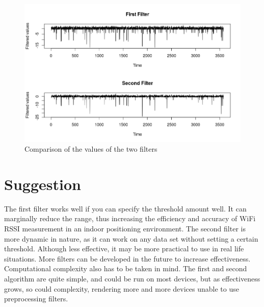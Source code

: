 \begin{figure}[h!]
	\centering
		\includegraphics[width=.9\linewidth]{figures/comp3.png}
		\caption{Comparison of the values of the two filters \cite{thirdcomp}}\label{fig:thirdComp}
\end{figure}


\section{Suggestion} 
The first filter works well if you can specify the threshold amount well. It can marginally reduce the range, thus increasing the efficiency and accuracy of WiFi RSSI measurement in an indoor positioning environment.  The second filter is more dynamic in nature, as it can work on any data set without setting a certain threshold. Although less effective, it may be more practical to use in real life situations. More filters can be developed in the future to increase effectiveness. Computational complexity also has to be taken in mind. The first and second algorithm are quite simple, and could be run on most devices, but as effectiveness grows, so could complexity, rendering more and more devices unable to use preprocessing filters.
